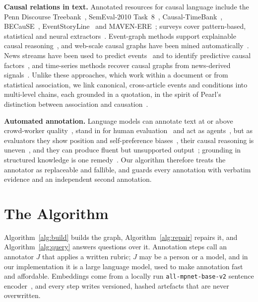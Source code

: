 \documentclass[conference]{IEEEtran}
\begin{document}
\textbf{Causal relations in text.} Annotated resources for causal language include the Penn
Discourse Treebank~\cite{pdtb}, SemEval-2010 Task~8~\cite{semeval}, Causal-TimeBank~\cite{mirza},
BECauSE~\cite{because}, EventStoryLine~\cite{storyline} and MAVEN-ERE~\cite{mavenere}; surveys cover
pattern-based, statistical and neural extractors~\cite{yangsurvey}. Event-graph methods support
explainable causal reasoning~\cite{excar}, and web-scale causal graphs have been mined
automatically~\cite{causenet}. News streams have been used to predict events~\cite{radinsky} and to
identify predictive causal factors~\cite{balashankar}, and time-series methods recover causal graphs
from news-derived signals~\cite{maisonnave,runge}. Unlike these approaches, which work within a
document or from statistical association, we link canonical, cross-article events and conditions
into multi-level chains, each grounded in a quotation, in the spirit of Pearl's distinction between
association and causation~\cite{pearl}.

\textbf{Automated annotation.} Language models can annotate text at or above crowd-worker
quality~\cite{gilardi,tornberg}, stand in for human evaluation~\cite{chiang} and act as
agents~\cite{agentsurvey,react}, but as evaluators they show position and self-preference
biases~\cite{zheng,wangfair}, their causal reasoning is uneven~\cite{kiciman,cladder}, and they can
produce fluent but unsupported output~\cite{hallucination}; grounding in structured knowledge is one
remedy~\cite{pan24}. Our algorithm therefore treats the annotator as replaceable and fallible, and
guards every annotation with verbatim evidence and an independent second annotation.

\section{The Algorithm}
Algorithm~\ref{alg:build} builds the graph, Algorithm~\ref{alg:repair} repairs it, and
Algorithm~\ref{alg:query} answers questions over it. Annotation steps call an annotator $J$ that
applies a written rubric; $J$ may be a person or a model, and in our implementation it is a large
language model, used to make annotation fast and affordable. Embeddings come from a locally run
\texttt{all-mpnet-base-v2} sentence encoder~\cite{sbert}, and every step writes versioned, hashed
artefacts that are never overwritten.
\end{document}
